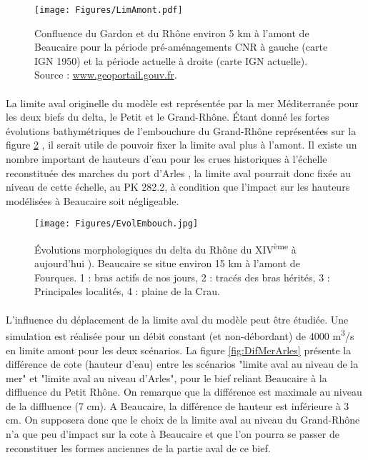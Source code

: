 \documentclass[11pt]{article}
\begin{document}
	 \begin{figure}[h]
		\centering
	    \texttt{[image: Figures/LimAmont.pdf]}
        \caption{Confluence du Gardon et du Rhône environ 5 km à l'amont de Beaucaire pour la période pré-aménagements CNR à gauche (carte IGN 1950) et la période actuelle à droite (carte IGN actuelle). Source : \url{www.geoportail.gouv.fr}.}
		\label{fig:LimAmont}
	\end{figure}
	 
	\paragraph{} La limite aval originelle du modèle est représentée par la mer Méditerranée pour les deux biefs du delta, le Petit et le Grand-Rhône. Étant donné les fortes évolutions bathymétriques de l'embouchure du Grand-Rhône représentées sur la figure \ref{fig:Embouch} \citep{pichard_les_2014}, il serait utile de pouvoir fixer la limite aval plus à l'amont. Il existe un nombre important de hauteurs d'eau pour les crues historiques à l'échelle reconstituée des marches du port d'Arles \citep{pichard_les_1995}, la limite aval pourrait donc fixée au niveau de cette échelle, au PK 282.2, à condition que l'impact sur les hauteurs modélisées à Beaucaire soit négligeable.
	
	\begin{figure}[h]
		\centering
	    \texttt{[image: Figures/EvolEmbouch.jpg]}
        \caption{Évolutions morphologiques du delta du Rhône du XIV\textsuperscript{ème} à aujourd'hui \citep{pichard_les_2014}). Beaucaire se situe environ 15 km à l'amont de Fourques. 1 : bras actifs de nos jours, 2 : tracés des bras hérités, 3 : Principales localités, 4 : plaine de la Crau.}
		\label{fig:Embouch}
	\end{figure}

	\paragraph{} L'influence du déplacement de la limite aval du modèle peut être étudiée. Une simulation est réalisée pour un débit constant (et non-débordant) de 4000 m\textsuperscript{3}/s en limite amont pour les deux scénarios. La figure \ref{fig:DifMerArles} présente la différence de cote (hauteur d'eau) entre les scénarios "limite aval au niveau de la mer" et "limite aval au niveau d'Arles", pour le bief reliant Beaucaire à la diffluence du Petit Rhône. On remarque que la différence est maximale au niveau de la diffluence (7 cm). A Beaucaire, la différence de hauteur est inférieure à 3 cm. On supposera donc que le choix de la limite aval au niveau du Grand-Rhône n'a que peu d'impact sur la cote à Beaucaire et que l'on pourra se passer de reconstituer les formes anciennes de la partie aval de ce bief. 
	 
\end{document}
